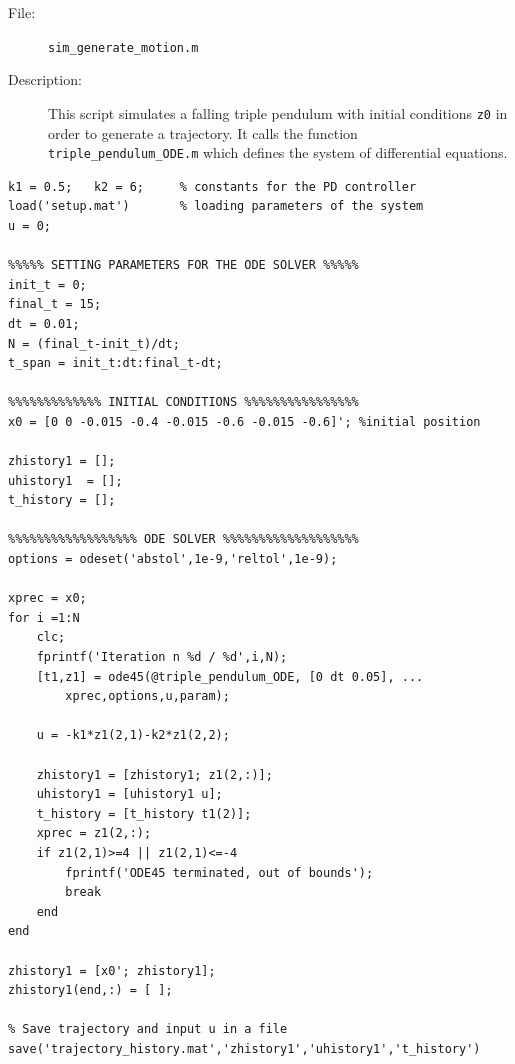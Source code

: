 \documentclass[a4paper,12pt]{article}
\begin{document}
\begin{description}
	\item[File:] \texttt{sim\_generate\_motion.m}
	\item[Description:] This script simulates a falling triple pendulum with initial conditions \texttt{z0} in order to generate a trajectory. It calls the function \texttt{triple\_pendulum\_ODE.m} which defines the system of differential equations.
\end{description}
\begin{lstlisting}[label=code:simgenerate,caption=\texttt{sim\_generate\_motion.m}]
%%%%%%%%% DEFINITIONS OF THE PARAMETERS %%%%%%%%%
k1 = 0.5;   k2 = 6;     % constants for the PD controller
load('setup.mat')       % loading parameters of the system
u = 0;

%%%%% SETTING PARAMETERS FOR THE ODE SOLVER %%%%%
init_t = 0;
final_t = 15;
dt = 0.01;
N = (final_t-init_t)/dt;
t_span = init_t:dt:final_t-dt;

%%%%%%%%%%%%% INITIAL CONDITIONS %%%%%%%%%%%%%%%%
x0 = [0 0 -0.015 -0.4 -0.015 -0.6 -0.015 -0.6]'; %initial position

zhistory1 = [];
uhistory1  = [];
t_history = [];

%%%%%%%%%%%%%%%%%% ODE SOLVER %%%%%%%%%%%%%%%%%%%
options = odeset('abstol',1e-9,'reltol',1e-9);

xprec = x0;
for i =1:N
    clc;
    fprintf('Iteration n %d / %d',i,N);
    [t1,z1] = ode45(@triple_pendulum_ODE, [0 dt 0.05], ...
        xprec,options,u,param);
    
    u = -k1*z1(2,1)-k2*z1(2,2);

    zhistory1 = [zhistory1; z1(2,:)];
    uhistory1 = [uhistory1 u];
    t_history = [t_history t1(2)];
    xprec = z1(2,:);
    if z1(2,1)>=4 || z1(2,1)<=-4
        fprintf('ODE45 terminated, out of bounds');
        break
    end
end

zhistory1 = [x0'; zhistory1];
zhistory1(end,:) = [ ];

% Save trajectory and input u in a file
save('trajectory_history.mat','zhistory1','uhistory1','t_history')
\end{lstlisting}
\end{document}
